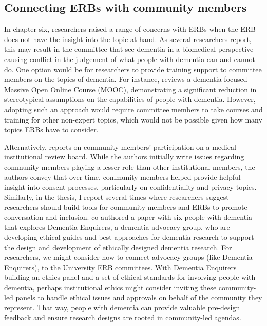 \subsection{Connecting ERBs with community members}
\label{ERBs-Community-Members}
In chapter six, researchers raised a range of concerns with ERBs when the ERB does not have the insight into the topic at hand. As several researchers report, this may result in the committee that see dementia in a biomedical perspective causing conflict in the judgement of what people with dementia can and cannot do. One option would be for researchers to provide training support to committee members on the topics of dementia. For instance, \cite{goldberg2015relationship} reviews a dementia-focused Massive Open Online Course (MOOC), demonstrating a significant reduction in stereotypical assumptions on the capabilities of people with dementia. However, adopting such an approach would require committee members to take courses and training for other non-expert topics, which would not be possible given how many topics ERBs have to consider. 

Alternatively, \cite{lidz2012participation} reports on community members' participation on a medical institutional review board. While the authors initially write issues regarding community members playing a lesser role than other institutional members, the authors convey that over time, community members helped provide helpful insight into consent processes, particularly on confidentiality and privacy topics. Similarly, in the thesis, I report several times where researchers suggest researchers should build tools for community members and ERBs to promote conversation and inclusion. \cite{davies2021dementia} co-authored a paper with six people with dementia that explores Dementia Enquirers, a dementia advocacy group, who are developing ethical guides and best approaches for dementia research to support the design and development of ethically designed dementia research. For researchers, we might consider how to connect advocacy groups (like Dementia Enquirers), to the University ERB committees. With Dementia Enquirers building an ethics panel and a set of ethical standards for involving people with dementia, perhaps institutional ethics might consider inviting these community-led panels to handle ethical issues and approvals on behalf of the community they represent. That way, people with dementia can provide valuable pre-design feedback and ensure research designs are rooted in community-led agendas. 

